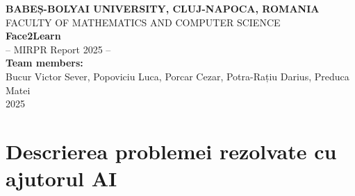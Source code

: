 \documentclass[12pt,a4paper]{report}
\begin{document}
\begin{center}
{\Large \textbf{BABEȘ-BOLYAI UNIVERSITY, CLUJ-NAPOCA, ROMANIA}}\\[0.2cm]
{\large FACULTY OF MATHEMATICS AND COMPUTER SCIENCE}\\[2cm]
{\Huge \textbf{Face2Learn}}\\[0.3cm]
{\Large -- MIRPR Report 2025 --}\\[2cm]

\textbf{Team members:}\\
Bucur Victor Sever, Popoviciu Luca, Porcar Cezar, Potra-Rațiu Darius, Preduca Matei\\[2cm]
2025
\end{center}

\newpage

\begin{abstract}
Aplicația reprezintă un sistem inteligent bazat pe inteligență artificială, denumit \textbf{Face2Learn}, care combină modele de limbaj mari (LLM), sinteză vocală (TTS) și animație facială pentru a crea o experiență de învățare naturală și interactivă. Scopul proiectului este de a transforma informațiile academice în explicații conversaționale, vizuale și auditive, crescând astfel implicarea, accesibilitatea și retenția informației.

În versiunea finală, sistemul a fost migrat către o arhitectură Full-Stack modernă. Backend-ul (REST API cu FastAPI) este optimizat pentru latență scăzută și rulare multi-platformă (CUDA/Metal), utilizând mecanisme avansate de RAG (Hybrid Search, Cosine Similarity). Frontend-ul, dezvoltat în React și Vite, oferă o interfață grafică intuitivă, cu elemente de design modern (Glassmorphism) și feedback vizual în timp real.
\end{abstract}

\tableofcontents
\newpage

\chapter{Descrierea problemei rezolvate cu ajutorul AI}
\end{document}

